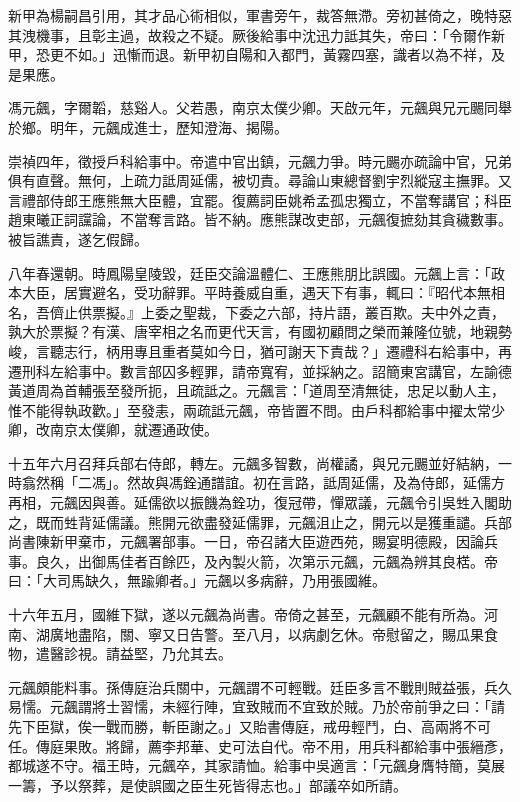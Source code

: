 \begin{pinyinscope}
新甲為楊嗣昌引用，其才品心術相似，軍書旁午，裁答無滯。旁初甚倚之，晚特惡其洩機事，且彰主過，故殺之不疑。厥後給事中沈迅力詆其失，帝曰：「令爾作新甲，恐更不如。」迅慚而退。新甲初自陽和入都門，黃霧四塞，識者以為不祥，及是果應。

馮元飆，字爾韜，慈谿人。父若愚，南京太僕少卿。天啟元年，元飆與兄元颺同舉於鄉。明年，元飆成進士，歷知澄海、揭陽。

崇禎四年，徵授戶科給事中。帝遣中官出鎮，元飆力爭。時元颺亦疏論中官，兄弟俱有直聲。無何，上疏力詆周延儒，被切責。尋論山東總督劉宇烈縱寇主撫罪。又言禮部侍郎王應熊無大臣體，宜罷。復薦詞臣姚希孟孤忠獨立，不當奪講官；科臣趙東曦正詞讜論，不當奪言路。皆不納。應熊謀改吏部，元飆復摭劾其貪穢數事。被旨譙責，遂乞假歸。

八年春還朝。時鳳陽皇陵毀，廷臣交論溫體仁、王應熊朋比誤國。元飆上言：「政本大臣，居實避名，受功辭罪。平時養威自重，遇天下有事，輒曰：『昭代本無相名，吾儕止供票擬。』上委之聖裁，下委之六部，持片語，叢百欺。夫中外之責，孰大於票擬？有漢、唐宰相之名而更代天言，有國初顧問之榮而兼隆位號，地親勢峻，言聽志行，柄用專且重者莫如今日，猶可謝天下責哉？」遷禮科右給事中，再遷刑科左給事中。數言部囚多輕罪，請帝寬宥，並採納之。詔簡東宮講官，左諭德黃道周為首輔張至發所扼，且疏詆之。元飆言：「道周至清無徒，忠足以動人主，惟不能得執政歡。」至發恚，兩疏詆元飆，帝皆置不問。由戶科都給事中擢太常少卿，改南京太僕卿，就遷通政使。

十五年六月召拜兵部右侍郎，轉左。元飆多智數，尚權譎，與兄元颺並好結納，一時翕然稱「二馮」。然故與馮銓通譜誼。初在言路，詆周延儒，及為侍郎，延儒方再相，元飆因與善。延儒欲以振饑為銓功，復冠帶，憚眾議，元飆令引吳甡入閣助之，既而甡背延儒議。熊開元欲盡發延儒罪，元飆沮止之，開元以是獲重譴。兵部尚書陳新甲棄市，元飆署部事。一日，帝召諸大臣遊西苑，賜宴明德殿，因論兵事。良久，出御馬佳者百餘匹，及內製火箭，次第示元飆，元飆為辨其良楛。帝曰：「大司馬缺久，無踰卿者。」元飆以多病辭，乃用張國維。

十六年五月，國維下獄，遂以元飆為尚書。帝倚之甚至，元飆顧不能有所為。河南、湖廣地盡陷，關、寧又日告警。至八月，以病劇乞休。帝慰留之，賜瓜果食物，遣醫診視。請益堅，乃允其去。

元飆頗能料事。孫傳庭治兵關中，元飆謂不可輕戰。廷臣多言不戰則賊益張，兵久易懦。元飆謂將士習懦，未經行陣，宜致賊而不宜致於賊。乃於帝前爭之曰：「請先下臣獄，俟一戰而勝，斬臣謝之。」又貽書傳庭，戒毋輕鬥，白、高兩將不可任。傳庭果敗。將歸，薦李邦華、史可法自代。帝不用，用兵科都給事中張縉彥，都城遂不守。福王時，元飆卒，其家請恤。給事中吳適言：「元飆身膺特簡，莫展一籌，予以祭葬，是使誤國之臣生死皆得志也。」部議卒如所請。


\end{pinyinscope}
